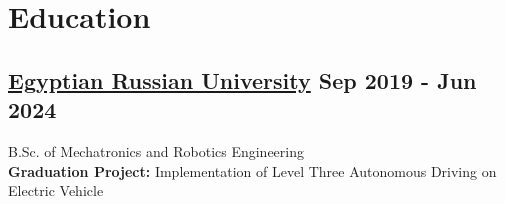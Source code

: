 \section*{Education}
%
%
%
\subsection*{
  \href{https://www.eru.edu.eg/}{Egyptian Russian University}
  \hspace*{\fill}
  \dateformat Sep 2019 - Jun 2024
}
B.Sc. of Mechatronics and Robotics Engineering\\
\textbf{Graduation Project:} Implementation of Level Three Autonomous Driving on Electric Vehicle